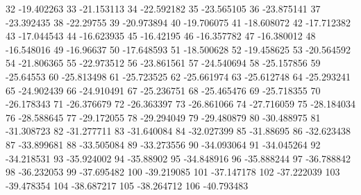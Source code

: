 32                      -19.402263
33                      -21.153113
34                      -22.592182
35                      -23.565105
36                      -23.875141
37                      -23.392435
38                       -22.29755
39                      -20.973894
40                      -19.706075
41                      -18.608072
42                      -17.712382
43                      -17.044543
44                      -16.623935
45                       -16.42195
46                      -16.357782
47                      -16.380012
48                      -16.548016
49                       -16.96637
50                      -17.648593
51                      -18.500628
52                      -19.458625
53                      -20.564592
54                      -21.806365
55                      -22.973512
56                      -23.861561
57                      -24.540694
58                      -25.157856
59                       -25.64553
60                      -25.813498
61                      -25.723525
62                      -25.661974
63                      -25.612748
64                      -25.293241
65                      -24.902439
66                      -24.910491
67                      -25.236751
68                      -25.465476
69                      -25.718355
70                      -26.178343
71                      -26.376679
72                      -26.363397
73                      -26.861066
74                      -27.716059
75                      -28.184034
76                      -28.588645
77                      -29.172055
78                      -29.294049
79                      -29.480879
80                      -30.488975
81                      -31.308723
82                      -31.277711
83                      -31.640084
84                      -32.027399
85                       -31.88695
86                      -32.623438
87                      -33.899681
88                      -33.505084
89                      -33.273556
90                      -34.093064
91                      -34.045264
92                      -34.218531
93                      -35.924002
94                       -35.88902
95                      -34.848916
96                      -35.888244
97                      -36.788842
98                      -36.232053
99                      -37.695482
100                      -39.219085
101                      -37.147178
102                      -37.222039
103                      -39.478354
104                      -38.687217
105                      -38.264712
106                      -40.793483
